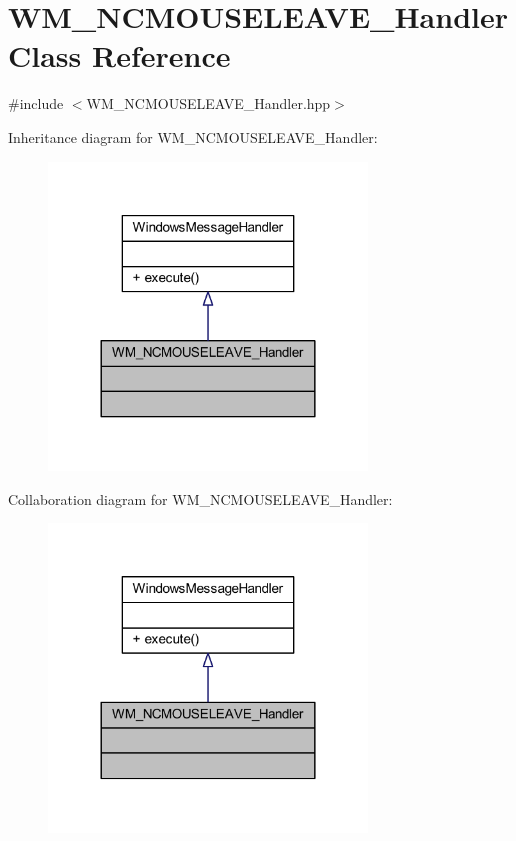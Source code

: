 \hypertarget{class_w_m___n_c_m_o_u_s_e_l_e_a_v_e___handler}{}\section{W\+M\+\_\+\+N\+C\+M\+O\+U\+S\+E\+L\+E\+A\+V\+E\+\_\+\+Handler Class Reference}
\label{class_w_m___n_c_m_o_u_s_e_l_e_a_v_e___handler}


{\ttfamily \#include $<$W\+M\+\_\+\+N\+C\+M\+O\+U\+S\+E\+L\+E\+A\+V\+E\+\_\+\+Handler.\+hpp$>$}



Inheritance diagram for W\+M\+\_\+\+N\+C\+M\+O\+U\+S\+E\+L\+E\+A\+V\+E\+\_\+\+Handler\+:\nopagebreak
\begin{figure}[H]
\begin{center}
\leavevmode
\includegraphics[width=240pt]{class_w_m___n_c_m_o_u_s_e_l_e_a_v_e___handler__inherit__graph}
\end{center}
\end{figure}


Collaboration diagram for W\+M\+\_\+\+N\+C\+M\+O\+U\+S\+E\+L\+E\+A\+V\+E\+\_\+\+Handler\+:\nopagebreak
\begin{figure}[H]
\begin{center}
\leavevmode
\includegraphics[width=240pt]{class_w_m___n_c_m_o_u_s_e_l_e_a_v_e___handler__coll__graph}
\end{center}
\end{figure}
